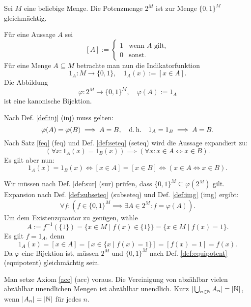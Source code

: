 \begin{Satz}
Sei $M$ eine beliebige Menge. Die Potenzmenge $2^M$ ist zur
Menge $\{0,1\}^M$ gleichmächtig.
\end{Satz}

\begin{Beweis}
Für eine Aussage $A$ sei
\[[A] := \begin{cases}
1&\text{wenn $A$ gilt},\\
0&\text{sonst}.
\end{cases}\]
Für eine Menge $A\subseteq M$ betrachte man nun die
Indikatorfunktion
\[1_A\colon M\to\{0,1\},\quad 1_A(x):=[x\in A].\]
Die Abbildung
\[\varphi\colon 2^M\to \{0,1\}^M,\quad \varphi(A):=1_A\]
ist eine kanonische Bijektion.

Nach Def. \ref{def:inj} (inj) muss gelten:
\[\varphi(A)=\varphi(B)\implies A=B,\quad\text{d.\,h.}\quad
1_A=1_B \implies A=B.\]
Nach Satz \ref{feq} (feq) und Def. \ref{def:seteq} (seteq)
wird die Aussage expandiert zu:
\[(\forall x\colon 1_A(x)=1_B(x))\implies
(\forall x\colon x\in A\iff x\in B).\]
Es gilt aber nun:
\[1_A(x)=1_B(x)\iff [x\in A]=[x\in B] \iff (x\in A\iff x\in B).\]
\end{Beweis}
 Wir müssen nach Def. \ref{def:sur} (sur)
prüfen, dass $\{0,1\}^M\subseteq \varphi(2^M)$ gilt.
Expansion nach Def. \ref{def:subseteq} (subseteq) und
Def. \ref{def:img} (img)
ergibt:
\[\forall f\colon (f\in \{0,1\}^M\implies\exists A{\in}2^M\colon f=\varphi(A)).\]
Um dem Existenzquantor zu genügen, wähle
\[A := f^{-1}(\{1\}) = \{x\in M\mid f(x)\in \{1\}\} = \{x\in M\mid f(x)=1\}.\]
Es gilt $f=1_A$, denn
\[1_A(x) = [x\in A] = [x\in\{x\mid f(x)=1\}] = [f(x)=1] = f(x).\]
Da $\varphi$ eine Bijektion ist, müssen $2^M$ und $\{0,1\}^M$
nach Def. \ref{def:equipotent} (equipotent) gleichmächtig
sein.\,\qedsymbol

\newpage
\begin{Satz}\label{countable-union-countable}
Man setze Axiom \ref{acc} (acc) voraus.
Die Vereinigung von abzählbar vielen abzählbar unendlichen Mengen
ist abzählbar unendlich. Kurz $|\bigcup_{n\in\mathbb N} A_n| = |\mathbb N|$, wenn
$|A_n|=|\mathbb N|$ für jedes $n$.
\end{Satz}


